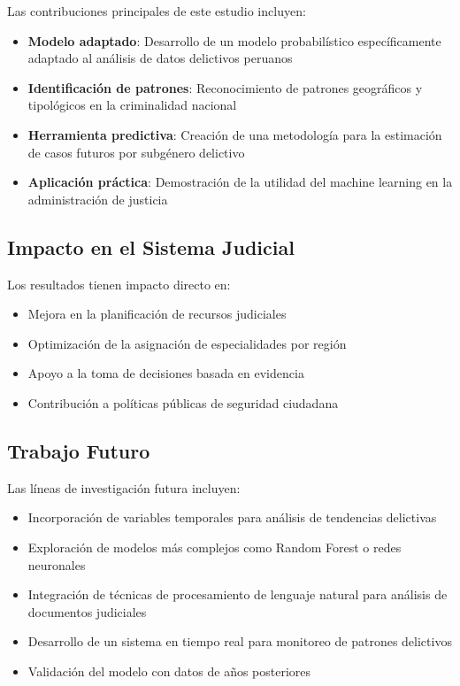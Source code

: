\documentclass[conference]{IEEEtran}
\begin{document}
Las contribuciones principales de este estudio incluyen:

\begin{itemize}
\item \textbf{Modelo adaptado}: Desarrollo de un modelo probabilístico específicamente adaptado al análisis de datos delictivos peruanos
\item \textbf{Identificación de patrones}: Reconocimiento de patrones geográficos y tipológicos en la criminalidad nacional
\item \textbf{Herramienta predictiva}: Creación de una metodología para la estimación de casos futuros por subgénero delictivo
\item \textbf{Aplicación práctica}: Demostración de la utilidad del machine learning en la administración de justicia
\end{itemize}

\subsection{Impacto en el Sistema Judicial}

Los resultados tienen impacto directo en:

\begin{itemize}
\item Mejora en la planificación de recursos judiciales
\item Optimización de la asignación de especialidades por región
\item Apoyo a la toma de decisiones basada en evidencia
\item Contribución a políticas públicas de seguridad ciudadana
\end{itemize}

\subsection{Trabajo Futuro}

Las líneas de investigación futura incluyen:

\begin{itemize}
\item Incorporación de variables temporales para análisis de tendencias delictivas
\item Exploración de modelos más complejos como Random Forest o redes neuronales
\item Integración de técnicas de procesamiento de lenguaje natural para análisis de documentos judiciales
\item Desarrollo de un sistema en tiempo real para monitoreo de patrones delictivos
\item Validación del modelo con datos de años posteriores
\end{itemize}
\end{document}
